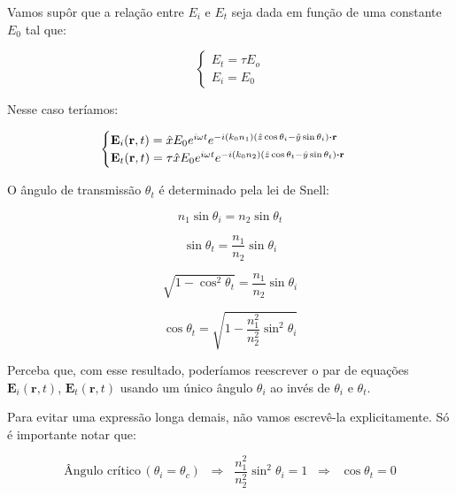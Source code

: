 \documentclass[12pt,a4paper]{report}
\begin{document}
Vamos supôr que a relação entre $E_i$ e $E_t$ seja dada em função de uma constante $E_0$ tal que:

\begin{equation}
    \begin{cases}
    E_t=\tau E_o\\
    E_i=E_0
\end{cases}
\end{equation}

Nesse caso teríamos:

\begin{equation*}
    \begin{cases}
    \textbf{E}_i(\textbf{r},t)=\hat{x}E_0e^{i\omega t}e^{-i(k_0n_1)(\hat{z}\cos\theta_i-\hat{y}\sin\theta_i)\vdot\textbf{r}}\\
    
    \textbf{E}_t(\textbf{r},t)=\tau\hat{x}E_0e^{i\omega t}e^{-i(k_0n_2)(\hat{z}\cos\theta_t-\hat{y}\sin\theta_t)\vdot\textbf{r}}
    \end{cases}
\end{equation*}

O ângulo de transmissão $\theta_t$ é determinado pela lei de Snell:

\begin{equation*}
    n_1\sin\theta_i=n_2\sin\theta_t
\end{equation*}

\begin{equation*}
    \sin\theta_t=\frac{n_1}{n_2}\sin\theta_i
\end{equation*}

\begin{equation*}
    \sqrt{1-\cos^2\theta_t}=\frac{n_1}{n_2}\sin\theta_i
\end{equation*}

\begin{equation*}
    \cos\theta_t=\sqrt{1-\frac{n_1^2}{n_2^2}\sin^2\theta_i}
\end{equation*}

Perceba que, com esse resultado, poderíamos reescrever o par de equações $\textbf{E}_i(\textbf{r},t)$, $\textbf{E}_t(\textbf{r},t)$ usando um único ângulo $\theta_i$ ao invés de $\theta_i$ e $\theta_t$.

Para evitar uma expressão longa demais, não vamos escrevê-la explicitamente. Só é importante notar que:

\begin{equation*}
    \text{Ângulo crítico}\,(\theta_i=\theta_c)\;\;\Rightarrow\;\;\frac{n_1^2}{n_2^2}\sin^2\theta_i=1\;\;\Rightarrow\;\;\cos\theta_t=0
\end{equation*}
\end{document}
